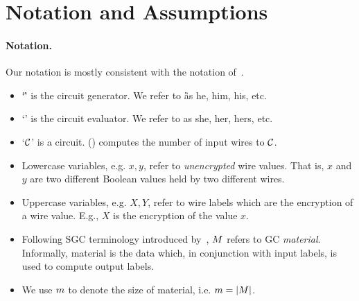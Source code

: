 \section{Notation and Assumptions}\label{sec:notation}

\paragraph{Notation.}

Our notation is mostly consistent with the notation of~\HK.

\begin{itemize}
	\item `\G' is the circuit generator. We refer to \G as
	he, him, his, etc.
	\item `\E' is the circuit evaluator. We refer to \E as
	she, her, hers, etc.
  \item `$\mathcal C$' is a circuit. \inpsize(\cir) computes the number of
    input wires to $\mathcal C$.
	\item Lowercase variables, e.g. $x, y$, refer to \emph{unencrypted} wire values.
	That is, $x$ and $y$ are two different Boolean values held by two different wires.
	\item Uppercase variables, e.g. $X, Y$, refer to wire labels which are the encryption of a wire value.
	E.g., $X$ is the encryption of the value $x$.
	\item Following SGC terminology introduced by~\cite{AC:Kolesnikov18}, $M$ refers to GC \emph{material}.
	Informally, material is the data which, in conjunction with input labels, is used to compute output labels.
\item We use $m$ to denote the size of material, i.e. $m =
  |M|$.

\end{itemize}
